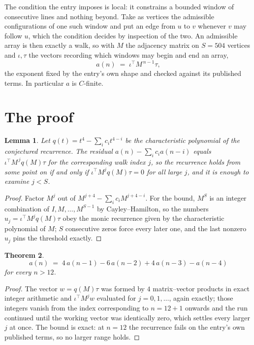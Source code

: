 \documentclass[11pt,a4paper]{article}
\theoremstyle{plain}
\newtheorem{theorem}{Theorem}
\newtheorem{lemma}[theorem]{Lemma}
\theoremstyle{definition}
\begin{document}
The condition the entry imposes is local: it constrains a bounded window of consecutive lines and nothing beyond. Take as
vertices the admissible configurations of one such window and put an edge from $u$ to $v$
whenever $v$ may follow $u$, which the condition decides by inspection of the two. An
admissible array is then exactly a walk, so with $M$ the adjacency matrix on $S=504$ vertices
and $\iota,\tau$ the vectors recording which windows may begin and end an array,
\[
a(n)\;=\;\iota^{\!\top}M^{\,n-1}\tau ,
\]
the exponent fixed by the entry's own shape and checked against its published terms. In
particular $a$ is $C$-finite.

\section{The proof}

\begin{lemma}\label{lem:crit}
Let $q(t)=t^{4}-\sum_i c_it^{4-i}$ be the characteristic polynomial of the
conjectured recurrence. The residual $a(n)-\sum_ic_ia(n-i)$ equals
$\iota^{\!\top}M^{\,j}q(M)\tau$ for the corresponding walk index $j$, so the recurrence
holds from some point on if and only if $\iota^{\!\top}M^{j}q(M)\tau=0$ for all large $j$,
and it is enough to examine $j<S$.
\end{lemma}

\begin{proof}
Factor $M^{j}$ out of $M^{j+4}-\sum_ic_iM^{j+4-i}$. For the bound, $M^{S}$
is an integer combination of $I,M,\dots,M^{S-1}$ by Cayley--Hamilton, so the numbers
$u_j=\iota^{\!\top}M^{j}q(M)\tau$ obey the monic recurrence given by the characteristic
polynomial of $M$; $S$ consecutive zeros force every later one, and the last nonzero $u_j$
pins the threshold exactly.
\end{proof}

\begin{theorem}
\[
a(n)\;=\;4\,a(n-1) - 6\,a(n-2) + 4\,a(n-3) - a(n-4)
\]
for every $n>12$.
\end{theorem}

\begin{proof}
The vector $w=q(M)\tau$ was formed by $4$ matrix--vector products in exact integer
arithmetic and $\iota^{\!\top}M^{j}w$ evaluated for $j=0,1,\dots$, again exactly; those
integers vanish from the index corresponding to $n=12+1$ onwards and the run continued
until the working vector was identically zero, which settles every larger $j$ at once. The bound is exact: at $n=12$ the recurrence fails on the entry's own published terms, so no larger range holds.
\end{proof}
\end{document}
